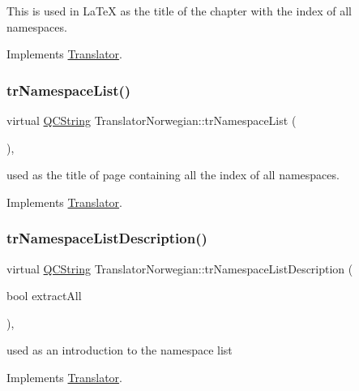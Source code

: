 This is used in La\+TeX as the title of the chapter with the index of all namespaces. 

Implements \mbox{\hyperlink{class_translator}{Translator}}.

\mbox{\label{class_translator_norwegian_a112cf9d7c4bf30cf4b08df6f955a147b}} 
\subsubsection{\texorpdfstring{trNamespaceList()}{trNamespaceList()}}
{\footnotesize\ttfamily virtual \mbox{\hyperlink{class_q_c_string}{Q\+C\+String}} Translator\+Norwegian\+::tr\+Namespace\+List (\begin{DoxyParamCaption}{ }\end{DoxyParamCaption})\hspace{0.3cm}{\ttfamily [inline]}, {\ttfamily [virtual]}}

used as the title of page containing all the index of all namespaces. 

Implements \mbox{\hyperlink{class_translator}{Translator}}.

\mbox{\label{class_translator_norwegian_a6f3d5dc20f9f7dff9c4f7cd0c81c8dab}} 
\subsubsection{\texorpdfstring{trNamespaceListDescription()}{trNamespaceListDescription()}}
{\footnotesize\ttfamily virtual \mbox{\hyperlink{class_q_c_string}{Q\+C\+String}} Translator\+Norwegian\+::tr\+Namespace\+List\+Description (\begin{DoxyParamCaption}\item[{bool}]{extract\+All }\end{DoxyParamCaption})\hspace{0.3cm}{\ttfamily [inline]}, {\ttfamily [virtual]}}

used as an introduction to the namespace list 

Implements \mbox{\hyperlink{class_translator}{Translator}}.

